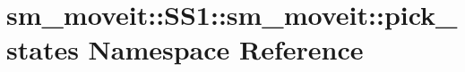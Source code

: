 \hypertarget{namespacesm__moveit_1_1SS1_1_1sm__moveit_1_1pick__states}{}\section{sm\+\_\+moveit\+:\+:S\+S1\+:\+:sm\+\_\+moveit\+:\+:pick\+\_\+states Namespace Reference}
\label{namespacesm__moveit_1_1SS1_1_1sm__moveit_1_1pick__states}
